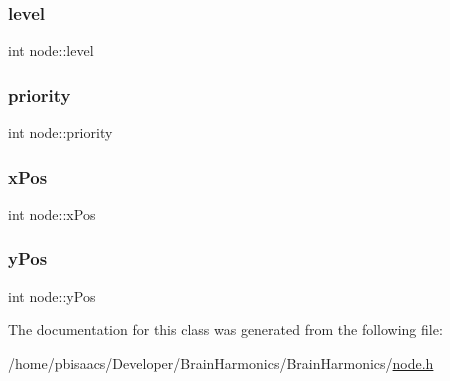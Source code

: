 \subsubsection{\texorpdfstring{level}{level}}
{\footnotesize\ttfamily int node\+::level\hspace{0.3cm}{\ttfamily [private]}}

\mbox{\label{classnode_a44e51013eb31fc1f17866ca9fe8ac75b}} 
\subsubsection{\texorpdfstring{priority}{priority}}
{\footnotesize\ttfamily int node\+::priority\hspace{0.3cm}{\ttfamily [private]}}

\mbox{\label{classnode_ac06985c464545107563b940285cb7883}} 
\subsubsection{\texorpdfstring{x\+Pos}{xPos}}
{\footnotesize\ttfamily int node\+::x\+Pos\hspace{0.3cm}{\ttfamily [private]}}

\mbox{\label{classnode_ae878a5c532b967296df247e1006adc51}} 
\subsubsection{\texorpdfstring{y\+Pos}{yPos}}
{\footnotesize\ttfamily int node\+::y\+Pos\hspace{0.3cm}{\ttfamily [private]}}



The documentation for this class was generated from the following file\+:\begin{DoxyCompactItemize}
\item 
/home/pbisaacs/\+Developer/\+Brain\+Harmonics/\+Brain\+Harmonics/\mbox{\hyperlink{node_8h}{node.\+h}}\end{DoxyCompactItemize}
